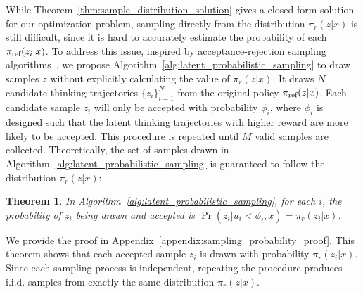 \documentclass{article} %
\newtheorem{theorem}{Theorem}
\begin{document}
%
%

While Theorem~\ref{thm:sample_distribution_solution} gives a closed-form solution for our optimization problem, sampling directly from the distribution $\pi_{r}(z|x)$ is still difficult, since it is hard to accurately estimate the probability of each $\pi_\text{ref}(z_i|x)$. To address this issue, inspired by acceptance-rejection sampling algorithms~\citep{flury1990acceptance,grover2018variational,liu2024statistical}, we propose Algorithm~\ref{alg:latent_probabilistic_sampling} to draw samples $z$ without explicitly calculating the value of $\pi_{r}(z|x)$. It draws $N$ candidate thinking trajectories $\{z_i\}^{N}_{i=1}$ from the original policy $\pi_\text{ref}(z|x)$. Each candidate sample $z_i$ will only be accepted with probability $\phi_{i}$, where $\phi_{i}$ is designed such that the latent thinking trajectories with higher reward are more likely to be accepted. This procedure is repeated until $M$ valid samples are collected. Theoretically, the set of samples drawn in Algorithm~\ref{alg:latent_probabilistic_sampling} is guaranteed to follow the distribution $\pi_{r}(z|x)$:
\begin{theorem}\label{thm:sampling_probability}
    In Algorithm~\ref{alg:latent_probabilistic_sampling}, for each $i$, the probability of $z_i$ being drawn and accepted is $\Pr(z_i|u_i<\phi_i,x)=\pi_{r}(z_i|x)$.
\end{theorem}
We provide the proof in Appendix~\ref{appendix:sampling_probability_proof}. This theorem shows that each accepted sample $z_i$ is drawn with probability $\pi_{r}(z_i|x)$. Since each sampling process is independent, repeating the procedure produces i.i.d. samples from exactly the same distribution $\pi_{r}(z|x)$.
\end{document}
